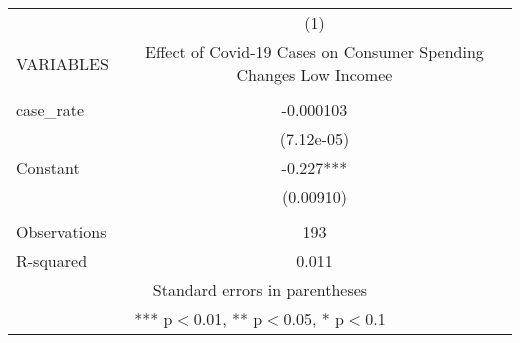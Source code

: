 \documentclass[]{article}
\begin{document}
\begin{tabular}{lc} \hline
 & (1) \\
VARIABLES & Effect of Covid-19 Cases on Consumer Spending Changes Low Incomee \\ \hline
 &  \\
case\_rate & -0.000103 \\
 & (7.12e-05) \\
Constant & -0.227*** \\
 & (0.00910) \\
 &  \\
Observations & 193 \\
 R-squared & 0.011 \\ \hline
\multicolumn{2}{c}{ Standard errors in parentheses} \\
\multicolumn{2}{c}{ *** p$<$0.01, ** p$<$0.05, * p$<$0.1} \\
\end{tabular}
\end{document}
